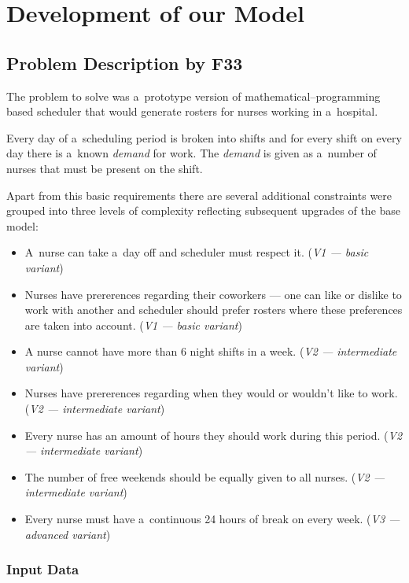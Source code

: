 \section{Development of our Model}

\subsection{Problem Description by F33}

The problem to solve was a~prototype version of mathematical--programming based scheduler that would generate rosters for nurses working in a~hospital. 

Every day of a~scheduling period is broken into shifts and for every shift on every day there is a~known \textit{demand} for work. The \textit{demand} is given as a~number of nurses that must be present on the shift.

Apart from this basic requirements there are several additional constraints were grouped into three levels of complexity reflecting subsequent upgrades of the base model:

\begin{itemize}
    \item A~nurse can take a~day off and scheduler must respect it. (\textit{V1 --- basic variant})
    \item Nurses have prererences regarding their coworkers --- one can like or dislike to work with another and scheduler should prefer rosters where these preferences are taken into account. (\textit{V1 --- basic variant})
    \item A nurse cannot have more than 6 night shifts in a week. (\textit{V2 --- intermediate variant})
    \item Nurses have prererences regarding when they would or wouldn't like to work. (\textit{V2 --- intermediate variant})
    \item Every nurse has an amount of hours they should work during this period. (\textit{V2 --- intermediate variant})
    \item The number of free weekends should be equally given to all nurses. (\textit{V2 --- intermediate variant})
    \item Every nurse must have a~continuous 24 hours of break on every week. (\textit{V3 --- advanced variant})
\end{itemize}

\subsubsection{Input Data}

